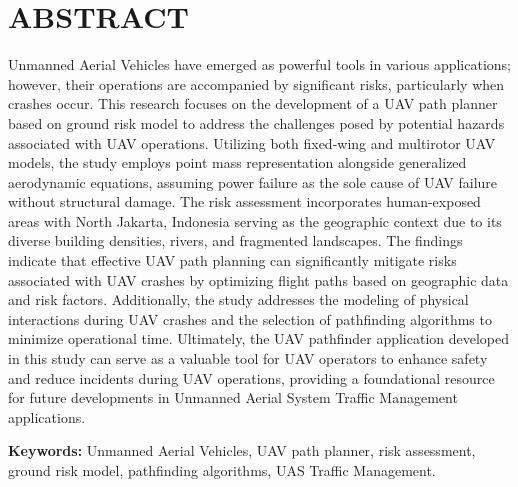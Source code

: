\documentclass[12pt]{report}
\begin{document}
    \chapter*{ABSTRACT}
    Unmanned Aerial Vehicles have emerged as powerful tools in various applications; however, their operations are
    accompanied by significant risks, particularly when crashes occur. This research focuses on the development of a UAV
    path planner based on ground risk model to address the challenges posed by potential hazards associated with UAV
    operations. Utilizing both fixed-wing and multirotor UAV models, the study employs point mass representation
    alongside generalized aerodynamic equations, assuming power failure as the sole cause of UAV failure without
    structural damage. The risk assessment incorporates human-exposed areas with North Jakarta, Indonesia serving as the
    geographic context due to its diverse building densities, rivers, and fragmented landscapes. The findings indicate
    that effective UAV path planning can significantly mitigate risks associated with UAV crashes by optimizing flight
    paths based on geographic data and risk factors. Additionally, the study addresses the modeling of physical
    interactions during UAV crashes and the selection of pathfinding algorithms to minimize operational time.
    Ultimately, the UAV pathfinder application developed in this study can serve as a valuable tool for UAV operators to
    enhance safety and reduce incidents during UAV operations, providing a foundational resource for future developments
    in Unmanned Aerial System Traffic Management applications.

    \textbf{Keywords:} Unmanned Aerial Vehicles, UAV path planner, risk assessment, ground risk model, pathfinding
    algorithms, UAS Traffic Management.

    \tableofcontents
    \listoffigures
    \listoftables
   
    \newpage
\end{document}
